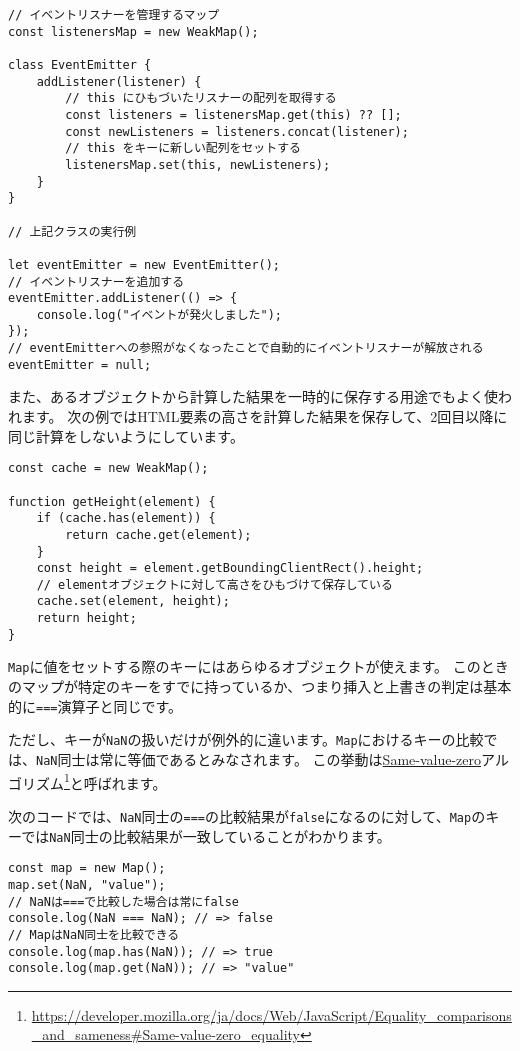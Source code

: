 \begin{lstlisting}
// イベントリスナーを管理するマップ
const listenersMap = new WeakMap();

class EventEmitter {
    addListener(listener) {
        // this にひもづいたリスナーの配列を取得する
        const listeners = listenersMap.get(this) ?? [];
        const newListeners = listeners.concat(listener);
        // this をキーに新しい配列をセットする
        listenersMap.set(this, newListeners);
    }
}

// 上記クラスの実行例

let eventEmitter = new EventEmitter();
// イベントリスナーを追加する
eventEmitter.addListener(() => {
    console.log("イベントが発火しました");
});
// eventEmitterへの参照がなくなったことで自動的にイベントリスナーが解放される
eventEmitter = null;
\end{lstlisting}

また、あるオブジェクトから計算した結果を一時的に保存する用途でもよく使われます。
次の例ではHTML要素の高さを計算した結果を保存して、2回目以降に同じ計算をしないようにしています。

\begin{lstlisting}
const cache = new WeakMap();

function getHeight(element) {
    if (cache.has(element)) {
        return cache.get(element);
    }
    const height = element.getBoundingClientRect().height;
    // elementオブジェクトに対して高さをひもづけて保存している
    cache.set(element, height);
    return height;
}
\end{lstlisting}

\begin{tcolorbox}[enhanced jigsaw,breakable,title=キーの等価性とNaN]\label{key-and-nan}

\texttt{Map}に値をセットする際のキーにはあらゆるオブジェクトが使えます。
このときのマップが特定のキーをすでに持っているか、つまり挿入と上書きの判定は基本的に\texttt{===}演算子と同じです。

ただし、キーが\texttt{NaN}の扱いだけが例外的に違います。\texttt{Map}におけるキーの比較では、\texttt{NaN}同士は常に等価であるとみなされます。
この挙動は\href{https://developer.mozilla.org/ja/docs/Web/JavaScript/Equality_comparisons_and_sameness\#Same-value-zero_equality}{Same-value-zero}アルゴリズム\footnote{\url{https://developer.mozilla.org/ja/docs/Web/JavaScript/Equality_comparisons_and_sameness\#Same-value-zero_equality}}と呼ばれます。

次のコードでは、\texttt{NaN}同士の\texttt{===}の比較結果が\texttt{false}になるのに対して、\texttt{Map}のキーでは\texttt{NaN}同士の比較結果が一致していることがわかります。

\begin{lstlisting}
const map = new Map();
map.set(NaN, "value");
// NaNは===で比較した場合は常にfalse
console.log(NaN === NaN); // => false
// MapはNaN同士を比較できる
console.log(map.has(NaN)); // => true
console.log(map.get(NaN)); // => "value"
\end{lstlisting}
\end{tcolorbox}

